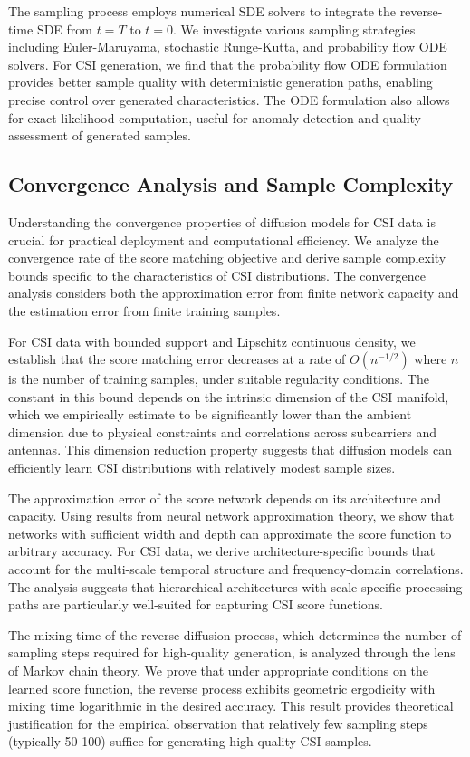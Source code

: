 \documentclass[journal]{IEEEtran}
\begin{document}
The sampling process employs numerical SDE solvers to integrate the reverse-time SDE from $t=T$ to $t=0$. We investigate various sampling strategies including Euler-Maruyama, stochastic Runge-Kutta, and probability flow ODE solvers. For CSI generation, we find that the probability flow ODE formulation provides better sample quality with deterministic generation paths, enabling precise control over generated characteristics. The ODE formulation also allows for exact likelihood computation, useful for anomaly detection and quality assessment of generated samples.

\subsection{Convergence Analysis and Sample Complexity}

Understanding the convergence properties of diffusion models for CSI data is crucial for practical deployment and computational efficiency. We analyze the convergence rate of the score matching objective and derive sample complexity bounds specific to the characteristics of CSI distributions. The convergence analysis considers both the approximation error from finite network capacity and the estimation error from finite training samples.

For CSI data with bounded support and Lipschitz continuous density, we establish that the score matching error decreases at a rate of $O(n^{-1/2})$ where $n$ is the number of training samples, under suitable regularity conditions. The constant in this bound depends on the intrinsic dimension of the CSI manifold, which we empirically estimate to be significantly lower than the ambient dimension due to physical constraints and correlations across subcarriers and antennas. This dimension reduction property suggests that diffusion models can efficiently learn CSI distributions with relatively modest sample sizes.

The approximation error of the score network depends on its architecture and capacity. Using results from neural network approximation theory, we show that networks with sufficient width and depth can approximate the score function to arbitrary accuracy. For CSI data, we derive architecture-specific bounds that account for the multi-scale temporal structure and frequency-domain correlations. The analysis suggests that hierarchical architectures with scale-specific processing paths are particularly well-suited for capturing CSI score functions.

The mixing time of the reverse diffusion process, which determines the number of sampling steps required for high-quality generation, is analyzed through the lens of Markov chain theory. We prove that under appropriate conditions on the learned score function, the reverse process exhibits geometric ergodicity with mixing time logarithmic in the desired accuracy. This result provides theoretical justification for the empirical observation that relatively few sampling steps (typically 50-100) suffice for generating high-quality CSI samples.
\end{document}
